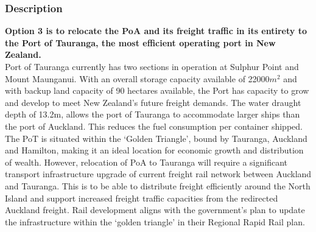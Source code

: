 \begin{multicols}{2}
    \subsubsection*{Description}
    \textbf{Option 3 is to relocate the PoA and its freight traffic in its entirety to the Port of Tauranga, the most efficient operating port in New Zealand.}
    \\Port of Tauranga currently has two sections in operation at Sulphur Point and Mount Maunganui. With an overall storage capacity available of 22000$m^2$ and with backup land capacity of 90 hectares available, the Port has capacity to grow and develop to meet New Zealand’s future freight demands. The water draught depth of 13.2m, allows the port of Tauranga to accommodate larger ships than the port of Auckland. This reduces the fuel consumption per container shipped. 
    \\The PoT is situated within the ‘Golden Triangle’, bound by Tauranga, Auckland and Hamilton, making it an ideal location for economic growth and distribution of wealth. However, relocation of PoA to Tauranga will require a significant transport infrastructure upgrade of current freight rail network between Auckland and Tauranga. This is to be able to distribute freight efficiently around the North Island and support increased freight traffic capacities from the redirected Auckland freight.  Rail development aligns with the government's plan to update the infrastructure within the ‘golden triangle’ in their Regional Rapid Rail plan.


\end{multicols}
